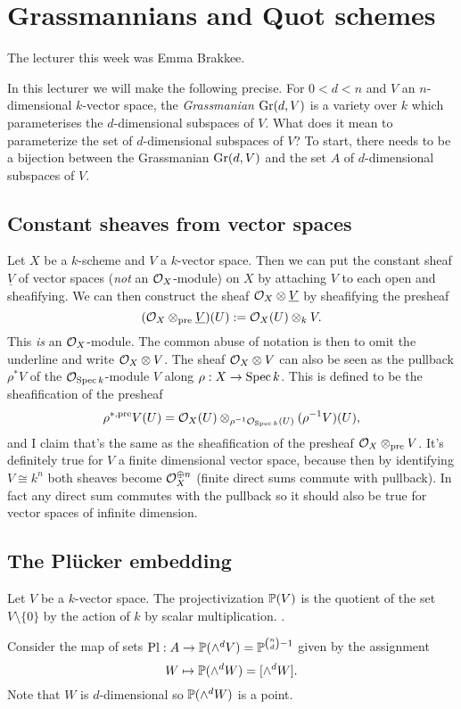 \chapter{Grassmannians and Quot schemes}
The lecturer this week was Emma Brakkee.

In this lecturer we will make the following precise. For $0 < d < n$ and $V$ an $n$-dimensional $k$-vector space, the \emph{Grassmanian} $\operatorname{Gr}(d, V)$ is a variety over $k$ which parameterises the $d$-dimensional subspaces of $V$. What does it mean to parameterize the set of $d$-dimensional subspaces of $V$? To start, there needs to be a bijection between the Grassmanian $\operatorname{Gr}(d, V)$ and the set $A$ of $d$-dimensional subspaces of $V$. 

\section{Constant sheaves from vector spaces}
Let $X$ be a $k$-scheme and $V$ a $k$-vector space.
Then we can put the constant sheaf $\underline{V}$ of vector spaces (\emph{not} an $\mathcal{O}_X$-module) on $X$ by attaching $V$ to each open and sheafifying.
We can then construct the sheaf $\mathcal{O}_X \otimes \underline{V}$ by sheafifying the presheaf \[
	(\mathcal{O}_X \otimes_{\operatorname{pre}}\underline{V})(U) := \mathcal{O}_X(U) \otimes_k V.
\]
This \emph{is} an $\mathcal{O}_X$-module. The common abuse of notation is then to omit the underline and write $\mathcal{O}_X \otimes V$.
The sheaf $\mathcal{O}_X \otimes V$ can also be seen as the pullback $\rho^* V$ of the $\mathcal{O}_{\operatorname{Spec} k}$-module $V$ along $\rho: X \to \operatorname{Spec} k$. This is defined to be the sheafification of the presheaf \[
	\rho^{*,\operatorname{pre}}V(U) =  \mathcal{O}_X(U) \otimes_{\rho^{-1}\mathcal{O}_{\operatorname{Spec} k}(U)}(\rho^{-1}V)(U),
\] and I claim that's the same as the sheafification of the presheaf $\mathcal{O}_X \otimes_{\operatorname{pre}} V$. 
It's definitely true for $V$ a finite dimensional vector space, because then by identifying $V \cong k^n$ both sheaves become $\mathcal{O}_X^{\oplus n}$ (finite direct sums commute with pullback).
In fact any direct sum commutes with the pullback so it should also be true for vector spaces of infinite dimension.

\section{The Plücker embedding}
\begin{definition}
	Let $V$ be a $k$-vector space. The projectivization $\mathbb{P}(V)$ is the quotient of the set $V\setminus \{0\}$ by the action of $k$ by scalar multiplication.
	.
\end{definition}
\begin{definition}
	Consider the map of sets $\operatorname{Pl}: A \to \mathbb{P}(\wedge^d V) = \mathbb{P}^{{n \choose d} - 1}$ given by the assignment \[W \mapsto \mathbb{P}(\wedge^d W) = [\wedge^d W].\] Note that $W$ is $d$-dimensional so $\mathbb{P}(\wedge^d W)$ is a point.
\end{definition}

